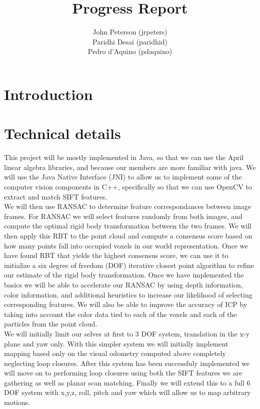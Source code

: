 \documentclass[12pt]{article}
\title{Progress Report}
\author{
	John Peterson (jrpeters)\\
	Paridhi Desai (paridhid)\\
	Pedro d'Aquino (pdaquino)}
\begin{document}
\maketitle

\section{Introduction}

\section{Technical details}
This project will be mostly implemented in Java, so that we can use the April linear algebra libraries, and because our members are more familiar with java.  We will use the Java Native Interface (JNI) to allow us to implement some of the computer vision components in C++, specifically so that we can use OpenCV to extract and match SIFT features. \\

	We will then use RANSAC to determine feature correspondances between image frames.  For RANSAC we will select features randomly from both images, and compute the optimal rigid body transformation between the two frames.  We will then apply this RBT to the point cloud and compute a consensus score based on how many points fall into occupied voxels in our world representation.  Once we have found RBT that yields the highest consensus score, we can use it to initialize a six degree of freedom (DOF) iterative closest point algorithm to refine our estimate of the rigid body transformation.  Once we have implemented the basics we will be able to accelerate our RANSAC by using depth information, color information, and additional heuristics to increase our likelihood of selecting corresponding features.  We will also be able to improve the accuracy of ICP by taking into account the color data tied to each of the voxels and each of the particles from the point cloud. \\

	We will initially limit our selves at first to 3 DOF system, translation in the x-y plane and yaw only.  With this simpler system we will initially implement mapping based only on the visual odometry computed above completely neglecting loop closures.  After this system has been successfuly implemented we will move on to performing loop closures using both the SIFT features we are gathering as well as planar scan matching.  Finally we will extend this to a full 6 DOF system with x,y,z, roll, pitch and yaw which will allow us to map arbitrary motions.  \\
\end{document}
